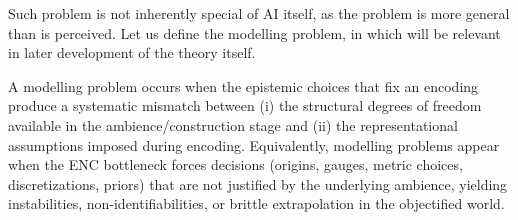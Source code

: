 Such problem is not inherently special of AI itself, as the problem is more general than is perceived. Let us define the modelling problem, in which will be relevant in later development of the theory itself. 

\begin{definition}
	A modelling problem occurs when the epistemic choices that fix an encoding produce a systematic mismatch between (i) the structural degrees of freedom available in the ambience/construction stage and (ii) the representational assumptions imposed during encoding. Equivalently, modelling problems appear when the ENC bottleneck forces decisions (origins, gauges, metric choices, discretizations, priors) that are not justified by the underlying ambience, yielding instabilities, non-identifiabilities, or brittle extrapolation in the objectified world.
\end{definition}

